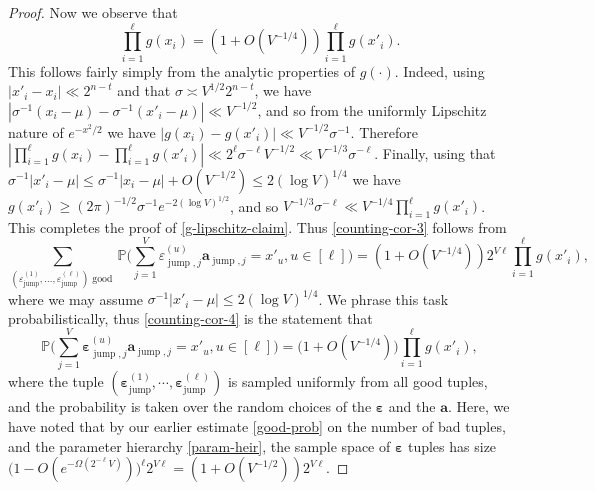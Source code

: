 \documentclass[11pt,reqno]{amsart}
\numberwithin{equation}{section}
\theoremstyle{definition}
\theoremstyle{remark}
\newcommand{\mb}{\mathbb}
\newcommand{\mbf}{\mathbf}
\newcommand{\eps}{\varepsilon}
\def\boldeps{\boldsymbol\eps}
\renewcommand{\le}{\leqslant}
\renewcommand{\ge}{\geqslant}
\newcommand\jump{\operatorname{jump}}
\begin{document}
\begin{proof}
Now we observe that 
\begin{equation}\label{g-lipschitz-claim} \prod_{i = 1}^{\ell} g(x_i) = (1 + O(V^{-1/4})) \prod_{i = 1}^{\ell} g(x'_i).\end{equation}
This follows fairly simply from the analytic properties of $g( \cdot)$. Indeed, using $|x'_i - x_i| \ll 2^{n - t}$ and that $\sigma \asymp V^{1/2} 2^{n - t}$, we have $|\sigma^{-1}(x_i - \mu) - \sigma^{-1} (x'_i -\mu)| \ll V^{- 1/2}$, and so from the uniformly Lipschitz nature of $e^{-x^2/2}$ we have $|g(x_i) - g(x'_i)| \ll V^{- 1/2} \sigma^{-1}$. Therefore $|\prod_{i = 1}^{\ell} g(x_i) - \prod_{i = 1}^{\ell} g(x'_i)| \ll 2^{\ell} \sigma^{-\ell} V^{- 1/2} \ll V^{-1/3} \sigma^{-\ell}$. Finally, using that $\sigma^{-1}|x'_i - \mu| \le \sigma^{-1}|x_i - \mu| + O(V^{- 1/2}) \le 2(\log V)^{1/4}$ we have $g(x'_i) \ge (2\pi)^{-1/2}\sigma^{-1} e^{-2(\log V)^{1/2}}$, and so $V^{-1/3} \sigma^{-\ell} \ll V^{-1/4} \prod_{i = 1}^{\ell} g(x'_i)$. This completes the proof of \cref{g-lipschitz-claim}.
Thus \cref{counting-cor-3} follows from 
\begin{equation}\label{counting-cor-4} \sum_{(\eps_{\jump}^{(1)}, \dots, \eps_{\jump}^{(\ell)}) \operatorname{good}}\mb{P}\Big( \sum_{j = 1}^V \eps_{\jump,j}^{(u)} \mbf{a}_{\jump,j} = x'_u, u \in [\ell]  \Big) = (1 + O(V^{-1/4}))  2^{V\ell} \prod_{i = 1}^{\ell} g(x'_i), \end{equation} 
where we may assume $\sigma^{-1} |x'_i - \mu| \le 2(\log V)^{1/4}$.
We phrase this task probabilistically, thus \cref{counting-cor-4} is the statement that 
\begin{equation}\label{counting-cor-4a}
\mb{P}\Big( \sum_{j = 1}^V \boldeps_{\jump,j}^{(u)} \mbf{a}_{\jump,j} = x'_u, u \in [\ell]  \Big) =  \big(1 + O(V^{-1/4})\big) \prod_{i = 1}^{\ell} g(x'_i),
\end{equation}
where the tuple $(\boldeps_{\jump}^{(1)},\cdots,\boldeps_{\jump}^{(\ell)})$ is sampled uniformly from all good tuples, and the probability is taken over the random choices of the $\boldeps$ and the $\mbf{a}$. Here, we have noted that by our earlier estimate \cref{good-prob} on the number of bad tuples, and the parameter hierarchy \cref{param-heir}, the sample space of $\boldeps$ tuples has size $\big( 1 - O(e^{-\Omega( 2^{-\ell} V)})\big)^{\ell} 2^{V\ell} = (1 + O(V^{-1/2})) 2^{V\ell}$.


\end{proof}
\end{document}
